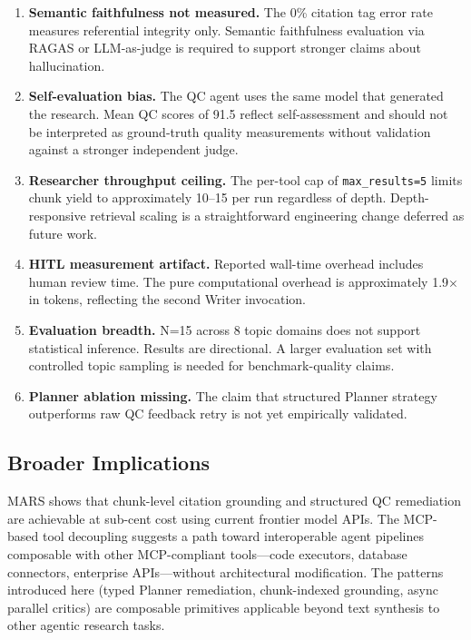 \documentclass[11pt]{article}
\begin{document}
\begin{enumerate}[leftmargin=*, label=\textbf{L\arabic*.}]

\item \textbf{Semantic faithfulness not measured.} The 0\% citation tag error
rate measures referential integrity only. Semantic faithfulness evaluation via
RAGAS \citep{es2023ragas} or LLM-as-judge \citep{zheng2023judging} is required
to support stronger claims about hallucination.

\item \textbf{Self-evaluation bias.} The QC agent uses the same model that
generated the research. Mean QC scores of 91.5 reflect self-assessment and
should not be interpreted as ground-truth quality measurements without
validation against a stronger independent judge.

\item \textbf{Researcher throughput ceiling.} The per-tool cap of
\texttt{max\_results=5} limits chunk yield to approximately 10--15 per run
regardless of depth. Depth-responsive retrieval scaling is a straightforward
engineering change deferred as future work.

\item \textbf{HITL measurement artifact.} Reported wall-time overhead includes
human review time. The pure computational overhead is approximately 1.9$\times$
in tokens, reflecting the second Writer invocation.

\item \textbf{Evaluation breadth.} N=15 across 8 topic domains does not support
statistical inference. Results are directional. A larger evaluation set with
controlled topic sampling is needed for benchmark-quality claims.

\item \textbf{Planner ablation missing.} The claim that structured Planner
strategy outperforms raw QC feedback retry is not yet empirically validated.

\end{enumerate}

\subsection{Broader Implications}

MARS shows that chunk-level citation grounding and structured QC remediation are
achievable at sub-cent cost using current frontier model APIs. The MCP-based
tool decoupling suggests a path toward interoperable agent pipelines composable
with other MCP-compliant tools---code executors, database connectors, enterprise
APIs---without architectural modification. The patterns introduced here (typed
Planner remediation, chunk-indexed grounding, async parallel critics) are
composable primitives applicable beyond text synthesis to other agentic research
tasks.
\end{document}
